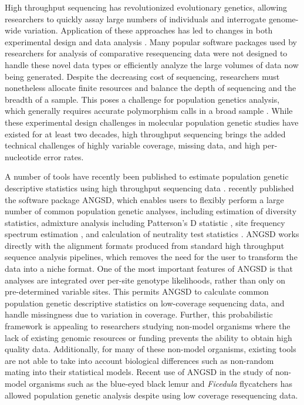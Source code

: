 \documentclass[10pt,a4paper]{article}
\begin{document}
High throughput sequencing has revolutionized evolutionary genetics, allowing researchers to quickly assay large numbers of individuals and interrogate genome-wide variation. 
Application of these approaches has led to changes in both experimental design and data analysis \citep{ekblom2011applications}. 
Many popular software packages used by researchers for analysis of comparative resequencing data \citep[see][]{excoffier2006computer} were not designed to handle these novel data types or efficiently analyze the large volumes of data now being generated. 
Despite the decreasing cost of sequencing, researchers must nonetheless allocate finite resources and balance the depth of sequencing and the breadth of a sample. 
This poses a challenge for population genetics analysis, which generally requires accurate polymorphism calls in a broad sample \citep{pluzhnikov1996optimal, felsenstein2006accuracy}. 
While these experimental design challenges in molecular population genetic studies have existed for at least two decades, high throughput sequencing brings the added technical challenges of highly variable coverage, missing data, and high per-nucleotide error rates.

A number of tools have recently been published to estimate population genetic descriptive statistics using high throughput sequencing data \citep{garrigan2013popbam, purcell2007plink, danecek2011variant, hutter2006genome}. 
 \citet{korneliussen2014angsd} recently published the software package ANGSD, which enables users to flexibly perform a large number of common population genetic analyses, including estimation of diversity statistics, admixture analysis including Patterson's D statistic \citep{Durand:2011jd}, site frequency spectrum estimation \citep{pmid22911679}, and calculation of neutrality test statistics \citep{korneliussen_calculation_2013}. 
ANGSD works directly with the alignment formats produced from standard high throughput sequence analysis pipelines, which removes the need for the user to transform the data into a niche format. 
One of the most important features of ANGSD is that analyses are integrated over per-site genotype likelihoods, rather than only on pre-determined variable sites. 
This permits ANGSD to calculate common population genetic descriptive statistics on low-coverage sequencing data, and handle missingness due to variation in coverage. 
Further, this probabilistic framework is appealing to researchers studying non-model organisms where the lack of existing genomic resources or funding prevents the ability to obtain high quality data. 
Additionally, for many of these non-model organisms, existing tools are not able to take into account biological differences such as non-random mating into their statistical models.
Recent use of ANGSD in the study of non-model organisms such as the blue-eyed black lemur \citep{meyer2015evolutionary} and \textit{Ficedula} flycatchers \citep{burri2015linked} has allowed population genetic analysis despite using low coverage resequencing data.
\end{document}
